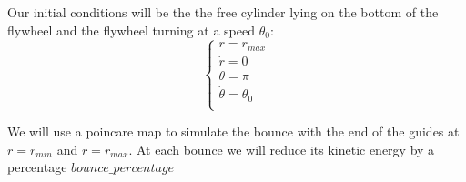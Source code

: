 Our initial conditions will be the the free cylinder lying on the bottom of the flywheel and the flywheel turning at a speed $\theta_0$:
\[
    \begin{cases}
        r = r_{max} \\
        \dot{r} = 0\\
        \theta = \pi\\
        \dot{\theta} = \theta_0\\
    \end{cases}
\]

We will use a poincare map to simulate the bounce with the end of the guides at $r=r_{min}$ and $r=r_{max}$. At each bounce we will reduce its kinetic energy by a percentage $bounce\_percentage$  


